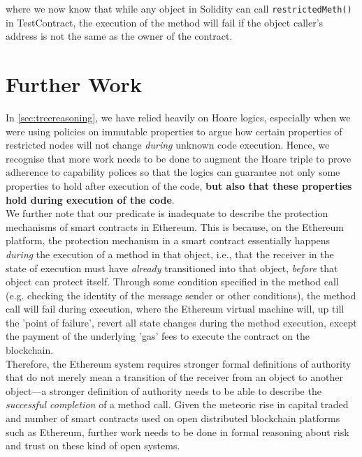\documentclass[a4paper,11pt,twoside]{article}
\begin{document}
{where we now know that while any object in Solidity can call \texttt{restrictedMeth()} in TestContract, the execution of the method will fail if the object caller's address is not the same as the owner of the contract.
\section{Further Work}
In \cref{sec:treereasoning}, we have relied heavily on Hoare logics, especially when we were using policies on immutable properties to argue how certain properties of restricted nodes will not change \textit{during} unknown code execution. Hence, we recognise that more work needs to be done to augment the Hoare triple to prove adherence to capability polices so that the logics can guarantee not only some properties to hold after execution of the code, \textbf{but also that these properties hold during execution of the code}.\\

We further note that our  predicate is inadequate to describe the protection mechanisms of smart contracts in Ethereum. This is because, on the Ethereum platform, the protection mechanism in a smart contract essentially happens \textit{during} the execution of a method in that object, i.e., that the receiver in the state of execution must have \textit{already} transitioned into that object, \textit{before} that object can protect itself. Through some condition specified in the method call (e.g. checking the identity of the message sender or other conditions), the method call will fail during execution, where the Ethereum virtual machine will, up till the 'point of failure', revert all state changes during the method execution, except the payment of the underlying 'gas' fees to execute the contract on the blockchain.\\

Therefore, the Ethereum system requires stronger formal definitions of authority that do not merely mean a transition of the receiver from an object to another object---a stronger definition of authority needs to be able to describe the \textit{successful completion} of a method call. Given the meteoric rise in capital traded and number of smart contracts used on open distributed blockchain platforms such as Ethereum, further work needs to be done in formal reasoning about risk and trust on these kind of open systems. 
}
\end{document}
